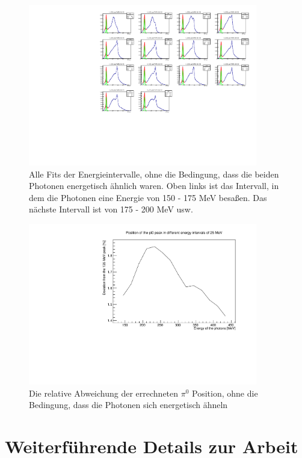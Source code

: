 \documentclass[a4paper,11pt,oneside,final,german,openbib,pdftex]{scrbook}
\begin{document}
{\begin{appendix}
\begin{figure}[h]
	\begin{center}
		\includegraphics[width=100mm]{allfitsallenergy1303}
		\caption{Alle Fits der Energieintervalle, ohne die Bedingung, dass die beiden Photonen energetisch ähnlich waren. Oben links ist das Intervall, in dem die Photonen eine Energie von 150 - 175 MeV besaßen. Das nächste Intervall ist von 175 - 200 MeV usw.}
		\label{fig:allenergyallfits}
	\end{center}
\end{figure}

\begin{figure}
	\begin{center}
		\includegraphics[width=100mm]{allenergyrelativedeviation1303}
		\caption{Die relative Abweichung der errechneten $\pi^0$ Position, ohne die Bedingung, dass die Photonen sich energetisch ähneln}
	\end{center}
\end{figure}

\section{Weiterf\"uhrende Details zur Arbeit}


\end{appendix}}
\end{document}
